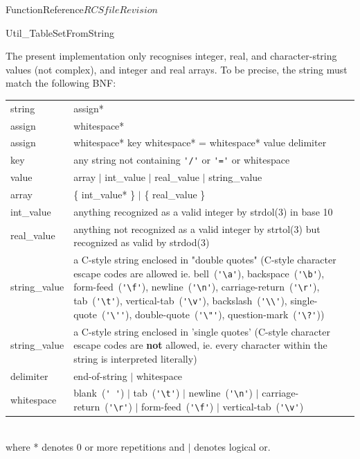 \begin{cactuspart}{FunctionReference}{$RCSfile$}{$Revision$}
\begin{FunctionDescription}{Util\_TableSetFromString}
\begin{Discussion}
The present implementation only recognises integer, real, and character-string
values (not complex), and integer and real arrays.
To be precise, the string must match the following BNF:\\
\quad
\begin{tabular}{l@{\quad$\rightarrow$\quad}p{9cm}}
string  & assign*                                                       \\
assign  & whitespace*                                                   \\
assign  & whitespace* key whitespace* = whitespace* value delimiter     \\
key     & any string not containing \verb|'/'| or \verb|'='| or whitespace\\
value   & array $\big|$ int\_value $\big|$ real\_value $\big|$ string\_value\\
array   & \{ int\_value* \} $\big|$ \{ real\_value \}                   \\
int\_value      & anything recognized as a valid integer by strdol(3)
                  in base 10                                            \\
real\_value     & anything not recognized as a valid integer by strtol(3)
                  but recognized as valid by strdod(3)                  \\
string\_value   & a C-style string enclosed in "double quotes"
                  (C-style character escape codes are allowed
                  ie. bell~(\verb|'\a'|), backspace~(\verb|'\b'|),
                  form-feed~(\verb|'\f'|), newline~(\verb|'\n'|),
                  carriage-return~(\verb|'\r'|), tab~(\verb|'\t'|),
                  vertical-tab~(\verb|'\v'|), backslash~(\verb|'\\'|),
                  single-quote~(\verb|'\''|), double-quote~(\verb|'\"'|),
                  question-mark~(\verb|'\?'|))                          \\
string\_value   & a C-style string enclosed in 'single quotes'
                  (C-style character escape codes are {\bf not} allowed,
                  ie. every character within the string is interpreted
                  literally)                                            \\
delimiter       & end-of-string $\big|$ whitespace                      \\
whitespace      & blank~(\verb|' '|)
                  $\big|$ tab~(\verb|'\t'|)
                  $\big|$ newline~(\verb|'\n'|)
                  $\big|$ carriage-return~(\verb|'\r'|)
                  $\big|$ form-feed~(\verb|'\f'|)
                  $\big|$ vertical-tab~(\verb|'\v'|)                    %
\end{tabular}\\
where * denotes 0 or more repetitions and $\big|$ denotes logical or.


\end{Discussion}
\end{FunctionDescription}
\end{cactuspart}
